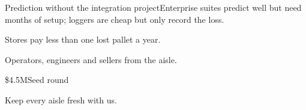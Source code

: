\documentclass[theme=venture,publication-type=presentation]{reportkit-slides}
\begin{document}
\begin{frame}
  \begin{visualtext}[left]{Prediction without the integration project}{Enterprise suites predict well but need months of setup; loggers are cheap but only record the loss.}
    
  \end{visualtext}
\end{frame}

\begin{frame}
  \begin{assertionslide}[kicker={Business model}]{Stores pay less than one lost pallet a year.}
    
  \end{assertionslide}
\end{frame}

\begin{frame}
  \begin{assertionslide}[kicker={Team}]{Operators, engineers and sellers from the aisle.}
    
  \end{assertionslide}
\end{frame}

\begin{frame}
  \begin{herometric}{\$4.5M}{Seed round}
    
  \end{herometric}
\end{frame}

\begin{frame}[plain]
  \begin{closingslide}{Keep every aisle fresh with us.}
    
  \end{closingslide}
\end{frame}
\end{document}
